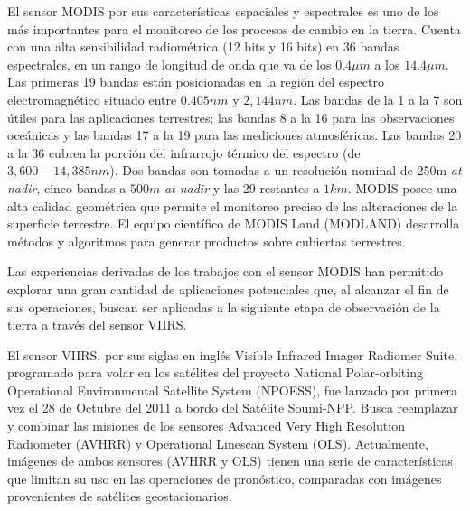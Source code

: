 El sensor MODIS por sus características espaciales y espectrales es uno de los más importantes para el monitoreo de los procesos de cambio en la tierra. Cuenta con una alta sensibilidad radiométrica (12 bits y 16 bits) en 36 bandas espectrales, en un rango de longitud de onda que va de los $0.4 \mu m$ a los $14.4 \mu m$. Las primeras 19 bandas están posicionadas en la región del espectro electromagnético situado entre $0.405 nm$ y $2, 144 nm$. Las bandas de la 1 a la 7 son útiles para las aplicaciones terrestres; las bandas 8 a la 16 para las observaciones oceánicas y las bandas 17 a la 19 para las mediciones atmosféricas. Las bandas 20 a la 36 cubren la porción del infrarrojo térmico del espectro (de $3, 600 -  14, 385 nm$). Dos bandas son tomadas a un resolución nominal de 250m \textit{at nadir}, cinco bandas a $500m$ \textit{at nadir} y las 29 restantes a $1km$. MODIS posee una alta calidad geométrica que permite el monitoreo preciso de las alteraciones de la superficie terrestre. El equipo científico de MODIS Land (MODLAND) desarrolla métodos y algoritmos para generar productos sobre cubiertas terrestres.

Las experiencias derivadas de los trabajos con el sensor MODIS han permitido explorar una gran cantidad de aplicaciones potenciales que, al alcanzar el fin de sus operaciones, buscan ser aplicadas a la siguiente etapa de observación de la tierra a través del sensor VIIRS.

El sensor VIIRS, por sus siglas en inglés Visible Infrared Imager Radiomer Suite, programado para volar en los satélites del proyecto National Polar-orbiting  Operational Environmental Satellite System (NPOESS), fue lanzado por primera vez el 28 de Octubre del 2011 a bordo del Satélite Soumi-NPP. Busca reemplazar y combinar las misiones de los sensores Advanced Very High Resolution Radiometer (AVHRR) y Operational Linescan System (OLS). Actualmente, imágenes de ambos sensores (AVHRR y OLS) tienen una serie de características que limitan su uso  en las operaciones de pronóstico, comparadas con imágenes provenientes de satélites geostacionarios. 

